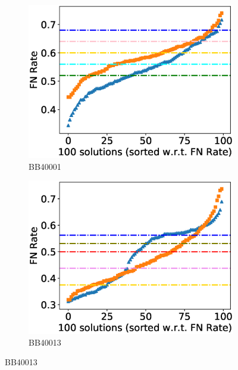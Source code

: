 \begin{figure}[!htbp]
	\centering
	\begin{adjustwidth}{-1cm}{-1cm}
		\begin{subfigure}{0.22\textwidth}
			\includegraphics[width=\columnwidth]{Figure/summary/precomputedInit/Balibase/BB40001_fnrate_density_single_run}
			\caption{BB40001}
		\end{subfigure}	
		\begin{subfigure}{0.22\textwidth}
			\includegraphics[width=\columnwidth]{Figure/summary/precomputedInit/Balibase/BB40013_fnrate_density_single_run}
			\caption{BB40013}
		\end{subfigure}

\end{adjustwidth}
\end{figure}
